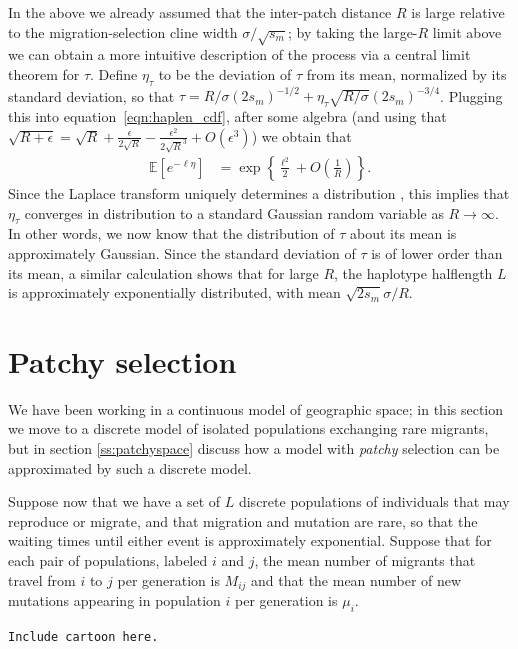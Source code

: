 \documentclass{article}
\newcommand{\E}{\mathbb{E}}
\begin{document}
In the above we already assumed that the inter-patch distance $R$ is large relative to the migration-selection cline width $\sigma/\sqrt{s_m}$;
by taking the large-$R$ limit above we can obtain a more intuitive description of the process
via a central limit theorem for $\tau$.
Define $\eta_\tau$ to be the deviation of $\tau$ from its mean, normalized by its standard deviation,
so that $\tau = R/\sigma(2s_m)^{-1/2} + \eta_\tau \sqrt{R/\sigma} (2s_m)^{-3/4}$.
Plugging this into equation~\eqref{eqn:haplen_cdf},
after some algebra (and using that $\sqrt{R+\epsilon} = \sqrt{R} + \frac{\epsilon}{2\sqrt{R}} - \frac{\epsilon^2}{2\sqrt{R}^3} + O(\epsilon^3)$) we obtain that
\begin{align}
  \E[e^{-\ell \eta}] &= \exp\left\{ \frac{\ell^2}{2} + O\left(\frac{1}{R}\right) \right\}.
\end{align}
Since the Laplace transform uniquely determines a distribution \citep{durrett1996probability},
this implies that $\eta_\tau$ converges in distribution to a standard Gaussian random variable as $R \to \infty$.
In other words, we now know that the distribution of $\tau$ about its mean is approximately Gaussian.
Since the standard deviation of $\tau$ is of lower order than its mean,
a similar calculation shows that for large $R$, the haplotype halflength $L$ is approximately exponentially distributed, 
with mean $\sqrt{2s_m} \sigma/R$.


\section{Patchy selection} 
\label{ss:discretedemes}

We have been working in a continuous model of geographic space; 
in this section we move to a discrete model of isolated populations exchanging rare migrants,
but in section \ref{ss:patchyspace} discuss how a model with {\em patchy} selection can be approximated by such a discrete model.

Suppose now that we have a set of $L$ discrete populations of individuals that may reproduce or migrate,
and that migration and mutation are rare, so that the waiting times until either event is approximately exponential.
Suppose that for each pair of populations, labeled $i$ and $j$, the mean number of migrants that travel from $i$ to $j$ per generation
is $M_{ij}$ and that the mean number of new mutations appearing in population $i$ per generation is $\mu_i$.

{\tt Include cartoon here.}
\end{document}
